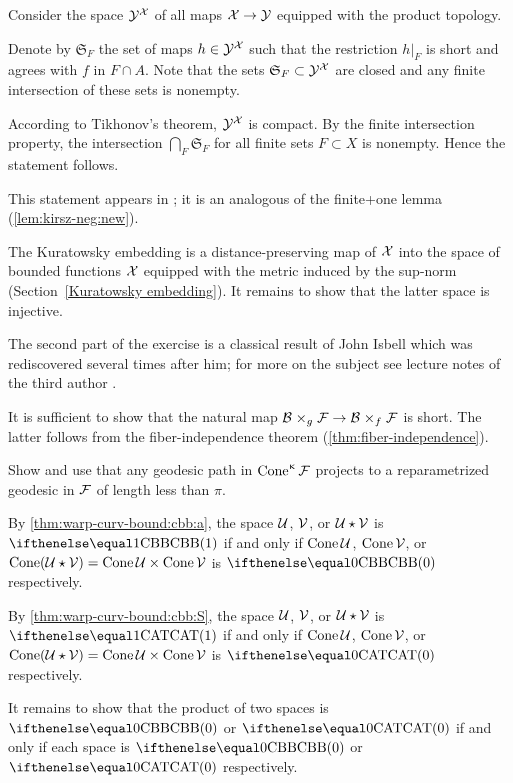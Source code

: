  Consider the space $\mathcal{Y}^{\mathcal{X}}$ of all maps $\spc{X}\to \spc{Y}$ equipped with the product topology.

Denote by $\mathfrak{S}_F$ the set of maps $h\in \spc{Y}^\spc{X}$ such that the restriction $h|_F$  is short and agrees with $f$ in $F\cap A$.
Note that the sets $\mathfrak{S}_F\subset \spc{Y}^\spc{X}$ are closed and any finite intersection of these sets is nonempty.

According to Tikhonov's theorem, $\mathcal{Y}^{\mathcal{X}}$ is compact.
By the finite intersection property, the intersection $\bigcap_F\mathfrak{S}_F$ for all finite sets $F\subset X$ is nonempty.
Hence the statement follows.

 This statement appears in \cite{petrunin-stadler}; it is an analogous of the finite+one lemma (\ref{lem:kirsz-neg:new}).

The Kuratowsky embedding is a distance-preserving map of $\mathcal{X}$ into the space of bounded functions $\mathcal{X}$ equipped with the metric induced by the sup-norm (Section~\ref{Kuratowsky embedding}).
It remains to show that the latter space is injective.

The second part of the exercise is a classical result of John Isbell \cite{isbell} which was rediscovered several times after him; for more on the subject see lecture notes of the third author \cite{petrunin2020pure}.

It is sufficient to show that the natural map $\spc{B}\warp{g}\spc{F}\to \spc{B}\warp{f}\spc{F}$ is short.
The latter follows from the fiber-independence theorem (\ref{thm:fiber-independence}).

Show and use that any geodesic path in $\mathop{\rm Cone}\nolimits^\upkappa\mathcal{F}$ projects to a reparametrized geodesic in $\mathcal{F}$ of length less than $\pi$.

By \ref{thm:warp-curv-bound:cbb:a}, the space $\mathcal{U}$, $\mathcal{V}$, or $\mathcal{U}\star\mathcal{V}$ is $\Alex1$ if and only if $\mathop{\rm Cone}\nolimits\mathcal{U}$, $\mathop{\rm Cone}\nolimits\mathcal{V}$, or $\Cone(\spc{U}\star\spc{V})=\Cone\spc{U}\times\Cone\spc{V}$ is $\Alex0$ respectively.

By \ref{thm:warp-curv-bound:cbb:S}, the space $\mathcal{U}$, $\mathcal{V}$, or $\mathcal{U}\star\mathcal{V}$ is $\CAT1$ if and only if $\mathop{\rm Cone}\nolimits\mathcal{U}$, $\mathop{\rm Cone}\nolimits\mathcal{V}$, or $\Cone(\spc{U}\star\spc{V})=\Cone\spc{U}\times\Cone\spc{V}$ is $\CAT0$ respectively.

It remains to show that the product of two spaces is $\Alex0$ or $\CAT0$ if and only if each space is $\Alex0$ or $\CAT0$ respectively.

